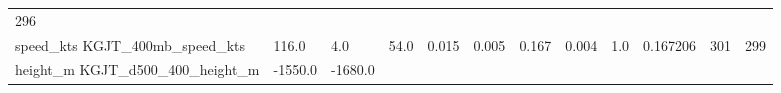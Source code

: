 \documentclass[11pt]{article}
\begin{document}
\begin{longtable}[]{@{}llllllllllll@{}}
\begin{minipage}[t]{0.07\columnwidth}
296\strut
\end{minipage}\tabularnewline
\begin{minipage}[t]{0.18\columnwidth}\raggedright\strut
speed\_kts KGJT\_400mb\_speed\_kts\strut
\end{minipage} & \begin{minipage}[t]{0.04\columnwidth}\raggedright\strut
116.0\strut
\end{minipage} & \begin{minipage}[t]{0.04\columnwidth}\raggedright\strut
4.0\strut
\end{minipage} & \begin{minipage}[t]{0.04\columnwidth}\raggedright\strut
54.0\strut
\end{minipage} & \begin{minipage}[t]{0.04\columnwidth}\raggedright\strut
0.015\strut
\end{minipage} & \begin{minipage}[t]{0.05\columnwidth}\raggedright\strut
0.005\strut
\end{minipage} & \begin{minipage}[t]{0.04\columnwidth}\raggedright\strut
0.167\strut
\end{minipage} & \begin{minipage}[t]{0.04\columnwidth}\raggedright\strut
0.004\strut
\end{minipage} & \begin{minipage}[t]{0.05\columnwidth}\raggedright\strut
1.0\strut
\end{minipage} & \begin{minipage}[t]{0.05\columnwidth}\raggedright\strut
0.167206\strut
\end{minipage} & \begin{minipage}[t]{0.05\columnwidth}\raggedright\strut
301\strut
\end{minipage} & \begin{minipage}[t]{0.07\columnwidth}\raggedright\strut
299\strut
\end{minipage}\tabularnewline
\begin{minipage}[t]{0.18\columnwidth}\raggedright\strut
height\_m KGJT\_d500\_400\_height\_m\strut
\end{minipage} & \begin{minipage}[t]{0.04\columnwidth}\raggedright\strut
-1550.0\strut
\end{minipage} & \begin{minipage}[t]{0.04\columnwidth}\raggedright\strut
-1680.0\strut
\end{minipage} & \begin{minipage}[t]{0.04\columnwidth}\raggedright\strut

\end{minipage}
\end{longtable}
\end{document}
